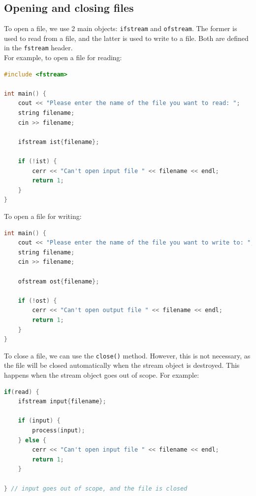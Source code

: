 \subsection{Opening and closing files}

To open a file, we use 2 main objects: \texttt{ifstream} and \texttt{ofstream}. The former is used
to read from a file, and the latter is used to write to a file. Both are defined in the \texttt{fstream}
header. \\

For example, to open a file for reading:\\

\begin{lstlisting}[language=C++]
#include <fstream>

int main() {
    cout << "Please enter the name of the file you want to read: ";
    string filename;
    cin >> filename;

    ifstream ist{filename};

    if (!ist) {
        cerr << "Can't open input file " << filename << endl;
        return 1;
    }
}
\end{lstlisting}

To open a file for writing:\\

\begin{lstlisting}[language=C++]
int main() {
    cout << "Please enter the name of the file you want to write to: ";
    string filename;
    cin >> filename;

    ofstream ost{filename};

    if (!ost) {
        cerr << "Can't open output file " << filename << endl;
        return 1;
    }
}
\end{lstlisting}

To close a file, we can use the \texttt{close()} method. However, this is not necessary, as the 
file will be closed automatically when the stream object is destroyed. This happens when the
stream object goes out of scope. For example:\\

\begin{lstlisting}[language=C++]
if(read) {
    ifstream input{filename};

    if (input) {
        process(input);
    } else {
        cerr << "Can't open input file " << filename << endl;
        return 1;
    }

} // input goes out of scope, and the file is closed
\end{lstlisting}

